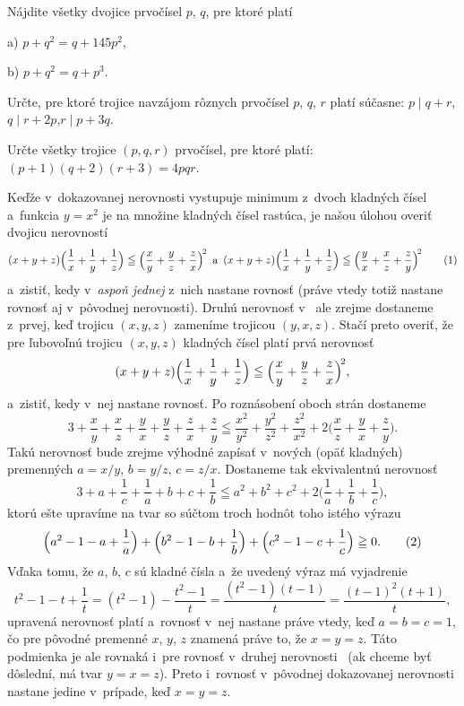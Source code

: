 {Nájdite všetky dvojice prvočísel $p$, $q$, pre ktoré platí
\item{a)} $p+q^{2}=q+145p^{2}$,\quad [55--C--II--4]
\item{b)} $p+q^2=q+p^3$.\quad        [55--B--II--1]

Určte, pre ktoré trojice navzájom rôznych prvočísel $p$, $q$, $r$
platí súčasne:
$p\mid q+r$,\quad $q\mid r+2p$,\quad$r\mid p+3q$.\quad[55--A--III--5]

Určte všetky trojice $(p,q,r)$ prvočísel, pre ktoré platí:
$(p+1)(q+2)(r+3)=4pqr$.\quad[60--A--III--2]

}

{%
Keďže v~dokazovanej nerovnosti vystupuje minimum z~dvoch
kladných čísel a~funkcia $y=x^2$ je na množine kladných čísel
rastúca, je našou úlohou overiť dvojicu nerovností
$$
(x+y+z)\Bigl(\frac{1}{x}+\frac{1}{y}+\frac{1}{z}\Bigr)\leqq
\Bigl(\frac{x}{y}+\frac{y}{z}+\frac{z}{x}\Bigr)^{\!2}
\enspace\text{a}\enspace
(x+y+z)\Bigl(\frac{1}{x}+\frac{1}{y}+\frac{1}{z}\Bigr)\leqq
\Bigl(\frac{y}{x}+\frac{x}{z}+\frac{z}{y}\Bigr)^{\!2}
\tag1
$$
a~zistiť, kedy v~{\it aspoň jednej\/} z~nich nastane rovnosť
(práve vtedy totiž nastane rovnosť aj v~pôvodnej nerovnosti).
Druhú nerovnosť v~ ale zrejme dostaneme z~prvej,
keď trojicu $(x,y,z)$ zameníme trojicou $(y,x,z)$. Stačí preto overiť,
že pre ľubovoľnú
trojicu $(x,y,z)$ kladných čísel platí prvá nerovnosť
$$
(x+y+z)\Bigl(\frac{1}{x}+\frac{1}{y}+\frac{1}{z}\Bigr)\leqq
\Bigl(\frac{x}{y}+\frac{y}{z}+\frac{z}{x}\Bigr)^{\!2},
$$
a~zistiť, kedy v~nej nastane rovnosť. Po roznásobení oboch strán dostaneme
$$
3+\frac{x}{y}+\frac{x}{z}+\frac{y}{x}+\frac{y}{z}+\frac{z}{x}+\frac{z}{y}
\leqq
\frac{x^2}{y^2}+\frac{y^2}{z^2}+\frac{z^2}{x^2}+
      2\Big(\frac{x}{z}+\frac{y}{x}+\frac{z}{y}\Big).
$$
Takú nerovnosť bude zrejme výhodné zapísať v~nových
(opäť kladných) premenných $a=x/y$, $b=y/z$, $c=z/x$. Dostaneme
tak ekvivalentnú nerovnosť
$$
3+a+\frac{1}{c}+\frac{1}{a}+b+c+\frac{1}{b}\leqq
a^2+b^2+c^2+2\Big(\frac{1}{a}+\frac{1}{b}+\frac{1}{c}\Big),
$$
ktorú ešte upravíme na tvar so súčtom troch hodnôt toho istého výrazu
$$
\Big(a^2-1-a+\frac{1}{a}\Big)+\Big(b^2-1-b+\frac{1}{b}\Big)+
\Big(c^2-1-c+\frac{1}{c}\Big)\geqq0.
\tag2$$
Vďaka tomu, že $a$, $b$, $c$ sú kladné čísla a~že uvedený výraz má
vyjadrenie
$$
t^2-1-t+\frac{1}{t}=(t^2-1)-\frac{t^2-1}{t}=\frac{(t^2-1)(t-1)}{t}=
\frac{(t-1)^2(t+1)}{t},
$$
upravená nerovnosť  platí a~rovnosť v~nej nastane práve vtedy, keď
$a=b=c=1$, čo pre pôvodné premenné $x$, $y$, $z$
znamená práve to, že $x=y=z$.
Táto podmienka je ale rovnaká i~pre rovnosť v~druhej nerovnosti~
(ak chceme byť dôslední, má tvar $y=x=z$). Preto i~rovnosť
v~pôvodnej dokazovanej nerovnosti nastane jedine v~prípade, keď
$x=y=z$.

}
